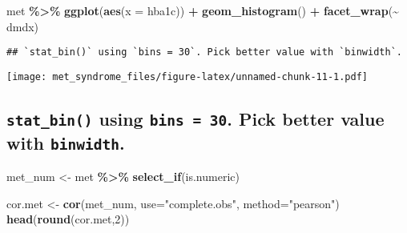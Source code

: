\documentclass[
]{article}
\newenvironment{Shaded}{\begin{snugshade}}{\end{snugshade}}
\newcommand{\AttributeTok}[1]{\textcolor[rgb]{0.13,0.29,0.53}{#1}}
\newcommand{\DecValTok}[1]{\textcolor[rgb]{0.00,0.00,0.81}{#1}}
\newcommand{\FunctionTok}[1]{\textcolor[rgb]{0.13,0.29,0.53}{\textbf{#1}}}
\newcommand{\NormalTok}[1]{#1}
\newcommand{\OtherTok}[1]{\textcolor[rgb]{0.56,0.35,0.01}{#1}}
\newcommand{\SpecialCharTok}[1]{\textcolor[rgb]{0.81,0.36,0.00}{\textbf{#1}}}
\newcommand{\StringTok}[1]{\textcolor[rgb]{0.31,0.60,0.02}{#1}}
\begin{document}
\begin{Shaded}
\begin{Highlighting}[]
\NormalTok{met }\SpecialCharTok{\%\textgreater{}\%} 
  \FunctionTok{ggplot}\NormalTok{(}\FunctionTok{aes}\NormalTok{(}\AttributeTok{x =}\NormalTok{ hba1c)) }\SpecialCharTok{+} 
  \FunctionTok{geom\_histogram}\NormalTok{() }\SpecialCharTok{+}
  \FunctionTok{facet\_wrap}\NormalTok{(}\SpecialCharTok{\textasciitilde{}}\NormalTok{ dmdx)}
\end{Highlighting}
\end{Shaded}

\begin{verbatim}
## `stat_bin()` using `bins = 30`. Pick better value with `binwidth`.
\end{verbatim}

\texttt{[image: met\_syndrome\_files/figure-latex/unnamed-chunk-11-1.pdf]}

\hypertarget{stat_bin-using-bins-30.-pick-better-value-with-binwidth.}{%
\subsection{\texorpdfstring{\texttt{stat\_bin()} using
\texttt{bins\ =\ 30}. Pick better value with
\texttt{binwidth}.}{stat\_bin() using bins = 30. Pick better value with binwidth.}}\label{stat_bin-using-bins-30.-pick-better-value-with-binwidth.}}

\begin{Shaded}
\begin{Highlighting}[]
\NormalTok{met\_num }\OtherTok{\textless{}{-}}\NormalTok{ met }\SpecialCharTok{\%\textgreater{}\%} 
  \FunctionTok{select\_if}\NormalTok{(is.numeric)}
\end{Highlighting}
\end{Shaded}

\begin{Shaded}
\begin{Highlighting}[]
\NormalTok{cor.met }\OtherTok{\textless{}{-}} \FunctionTok{cor}\NormalTok{(met\_num, }\AttributeTok{use=}\StringTok{"complete.obs"}\NormalTok{, }\AttributeTok{method=}\StringTok{"pearson"}\NormalTok{)}
\FunctionTok{head}\NormalTok{(}\FunctionTok{round}\NormalTok{(cor.met,}\DecValTok{2}\NormalTok{))}
\end{Highlighting}
\end{Shaded}
\end{document}
